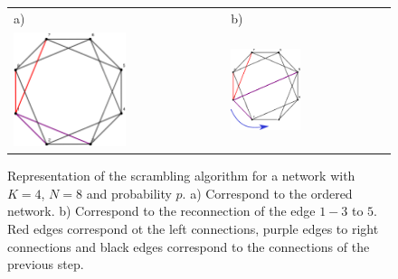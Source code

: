 \documentclass{article}
\begin{document}
\begin{figure}[H]
    \centering
    \begin{tabular}{l l}
        a) & b) \\
        \includegraphics[width=0.55\textwidth]{scram.eps} &
        \includegraphics[width=0.45\textwidth]{scram2.eps}
    \end{tabular}
    \caption{Representation of the scrambling algorithm for a  network with $K=4$, $N=8$ and  probability $p$. a) Correspond to the ordered network. b) Correspond to the reconnection of the edge $1-3$ to $5$. Red edges correspond ot the left connections, purple edges to right connections and black edges correspond to the connections of the previous step.}
    \label{scram}
\end{figure}
\end{document}
